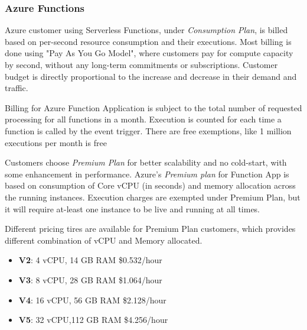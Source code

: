 \documentclass{article}
\begin{document}
\begin{flushleft}
\subsubsection{Azure Functions}
Azure customer using Serverless Functions, under \textit{Consumption Plan}, is billed based on per-second resource consumption and their executions. Most billing is done using "Pay As You Go Model", where customers pay for compute capacity by second, without any long-term commitments or subscriptions. Customer budget is directly proportional to the increase and decrease in their demand and traffic.
\par
 
Billing for Azure Function Application is subject to the total number of requested processing for all functions in a month. Execution is counted for each time a function is called by the event trigger. There are free exemptions, like 1 million executions per month is free
\par
Customers choose \textit{Premium Plan} for better scalability and no cold-start, with some enhancement in performance. Azure's \textit{Premium plan} for Function App is based on consumption of Core \gls{vCPU} (in seconds) and memory allocation across the running instances.
\hfill\break
Execution charges are exempted under Premium Plan, but it will require at-least one instance to be live and running at all times.
\par
Different pricing tires are available for Premium Plan customers, which provides different combination of \gls{vCPU} and Memory allocated.
\begin{itemize}
    \item \textbf{V2}: 4 \gls{vCPU},  14 GB \gls{RAM} \$0.532/hour
    \item \textbf{V3}: 8 \gls{vCPU},  28 GB \gls{RAM} \$1.064/hour
    \item \textbf{V4}: 16 \gls{vCPU}, 56 GB \gls{RAM} \$2.128/hour
    \item \textbf{V5}: 32 \gls{vCPU},112 GB \gls{RAM} \$4.256/hour
\end{itemize}
\par
\end{flushleft}
\pagebreak
\end{document}
